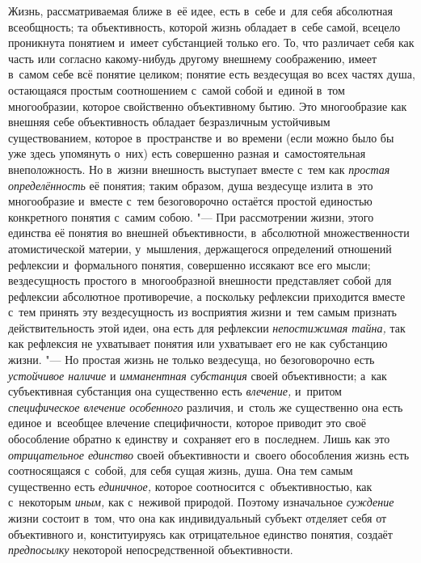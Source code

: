 Жизнь, рассматриваемая ближе в~её идее, есть в~себе и~для себя
абсолютная всеобщность; та объективность, которой жизнь обладает в~себе
самой, всецело проникнута понятием и~имеет субстанцией только его. То, что
различает себя как часть или согласно какому-нибудь другому внешнему
соображению, имеет в~самом себе всё понятие целиком; понятие есть
вездесущая во всех частях душа, остающаяся простым соотношением с~самой
собой и~единой в~том многообразии, которое свойственно объективному бытию.
Это многообразие как внешняя себе объективность обладает безразличным
устойчивым существованием, которое в~пространстве и~во времени (если можно
было бы уже здесь упомянуть о~них) есть совершенно разная и~самостоятельная
внеположность. Но в~жизни внешность выступает вместе с~тем как
{\em простая определённость}
её понятия; таким образом, душа вездесуще излита в~это
многообразие и~вместе с~тем безоговорочно остаётся простой единостью
конкретного понятия с~самим собою. "--- При рассмотрении жизни,
этого единства её понятия во внешней объективности, в~абсолютной
множественности атомистической материи, у~мышления,
держащегося определений отношений рефлексии и~формального понятия,
совершенно иссякают все его мысли; вездесущность простого в~многообразной
внешности представляет собой для рефлексии абсолютное противоречие, а
поскольку рефлексии приходится вместе с~тем принять эту вездесущность из
восприятия жизни и~тем самым признать действительность этой идеи, она есть
для рефлексии {\em непостижимая тайна,}
так как рефлексия не ухватывает понятия или ухватывает его не
как субстанцию жизни. "--- Но простая жизнь не только
вездесуща, но безоговорочно есть
{\em устойчивое наличие}
и {\em имманентная
субстанция} своей объективности; а~как субъективная
субстанция она существенно есть
{\em влечение,} и~притом
{\em специфическое влечение особенного}
различия, и~столь же существенно она есть единое и~всеобщее
влечение специфичности, которое приводит это своё обособление обратно к
единству и~сохраняет его в~последнем. Лишь как это
{\em отрицательное единство}
своей объективности и~своего обособления жизнь есть
соотносящаяся с~собой, для себя сущая жизнь, душа. Она тем самым
существенно есть {\em единичное,}
которое соотносится с~объективностью, как с~некоторым {\em иным,}
как с~неживой природой. Поэтому изначальное
{\em суждение}
жизни состоит в~том, что она как индивидуальный субъект
отделяет себя от объективного и, конституируясь как отрицательное единство
понятия, создаёт {\em предпосылку} некоторой непосредственной объективности.

